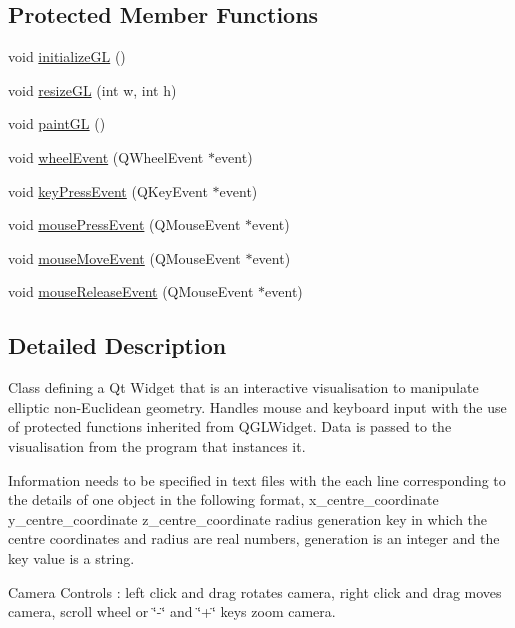 \subsection*{Protected Member Functions}
\begin{DoxyCompactItemize}
\item 
void \mbox{\hyperlink{classvis_aacc3b133f9fae3b66e1e13bfe789f314}{initialize\+GL}} ()
\item 
void \mbox{\hyperlink{classvis_af1b4cd445e1f1728eae264fcc6652ed7}{resize\+GL}} (int w, int h)
\item 
void \mbox{\hyperlink{classvis_ace835462bb98cad495e829c08e1a26ea}{paint\+GL}} ()
\item 
void \mbox{\hyperlink{classvis_afd39fa902cf24e1879d9c4139fb36385}{wheel\+Event}} (Q\+Wheel\+Event $\ast$event)
\item 
void \mbox{\hyperlink{classvis_a067c6621db4af8a2b34fe00a349b44db}{key\+Press\+Event}} (Q\+Key\+Event $\ast$event)
\item 
void \mbox{\hyperlink{classvis_aee3d8312e44262956a94ccc10b2469f7}{mouse\+Press\+Event}} (Q\+Mouse\+Event $\ast$event)
\item 
void \mbox{\hyperlink{classvis_a7c623384a8ab883c83256b988d7df536}{mouse\+Move\+Event}} (Q\+Mouse\+Event $\ast$event)
\item 
void \mbox{\hyperlink{classvis_a0c2adf27376ef0d784febfc572cd8729}{mouse\+Release\+Event}} (Q\+Mouse\+Event $\ast$event)
\end{DoxyCompactItemize}


\subsection{Detailed Description}
Class defining a Qt Widget that is an interactive visualisation to manipulate elliptic non-\/Euclidean geometry. Handles mouse and keyboard input with the use of protected functions inherited from Q\+G\+L\+Widget. Data is passed to the visualisation from the program that instances it.

Information needs to be specified in text files with the each line corresponding to the details of one object in the following format, x\+\_\+centre\+\_\+coordinate y\+\_\+centre\+\_\+coordinate z\+\_\+centre\+\_\+coordinate radius generation key in which the centre coordinates and radius are real numbers, generation is an integer and the key value is a string.

Camera Controls \+: left click and drag rotates camera, right click and drag moves camera, scroll wheel or \char`\"{}-\/\char`\"{} and \char`\"{}+\char`\"{} keys zoom camera.

